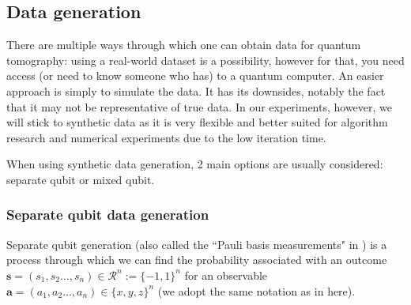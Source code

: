 \documentclass[12pt]{memoir}
\newcommand{\mb}{\mathbf}
\begin{document}
\subsection{Data generation}
There are multiple ways through which one can obtain data for quantum tomography: using a real-world dataset is a possibility, however for that, you need access (or need to know someone who has) to a quantum computer. An easier approach is simply to simulate the data. It has its downsides, notably the fact that it may not be representative of true data. In our experiments, however, we will stick to synthetic data as it is very flexible and better suited for algorithm research and numerical experiments due to the low iteration time.\medskip

When using synthetic data generation, 2 main options are usually considered: separate qubit or mixed qubit.


\subsubsection*{Separate qubit data generation}
Separate qubit generation (also called the ``Pauli basis measurements" in \cite{Guta20}) is a process through which we can find the probability associated with an outcome $\mb s = (s_1, s_2 \dots, s_n) \in \mathcal{R}^n := \{-1, 1\}^n $ for an observable $\mb a = (a_1, a_2 \dots, a_n) \in \{x,y,z\}^n$ (we adopt the same notation as in \cite{MA17} here).\medskip
\end{document}
